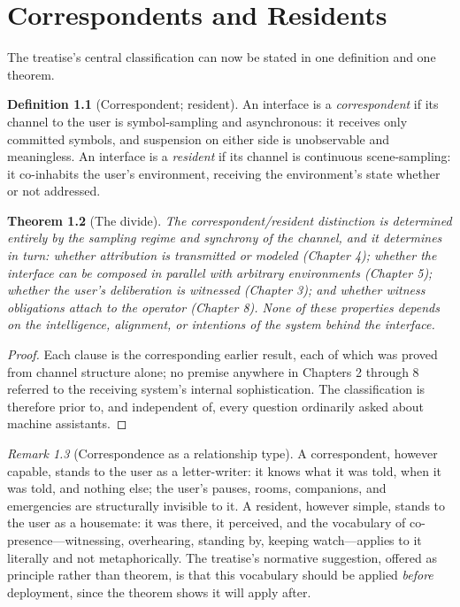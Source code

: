 \documentclass[11pt,oneside]{book}
\theoremstyle{plain}
\newtheorem{theorem}{Theorem}[chapter]
\theoremstyle{definition}
\newtheorem{definition}[theorem]{Definition}
\theoremstyle{remark}
\newtheorem{remark}[theorem]{Remark}
\begin{document}
\chapter{Correspondents and Residents}

The treatise's central classification can now be stated in one definition and one theorem.

\begin{definition}[Correspondent; resident]
An interface is a \emph{correspondent} if its channel to the user is symbol-sampling and asynchronous: it receives only committed symbols, and suspension on either side is unobservable and meaningless. An interface is a \emph{resident} if its channel is continuous scene-sampling: it co-inhabits the user's environment, receiving the environment's state whether or not addressed.
\end{definition}

\begin{theorem}[The divide]
The correspondent/resident distinction is determined entirely by the sampling regime and synchrony of the channel, and it determines in turn: whether attribution is transmitted or modeled (Chapter 4); whether the interface can be composed in parallel with arbitrary environments (Chapter 5); whether the user's deliberation is witnessed (Chapter 3); and whether witness obligations attach to the operator (Chapter 8). None of these properties depends on the intelligence, alignment, or intentions of the system behind the interface.
\end{theorem}

\begin{proof}
Each clause is the corresponding earlier result, each of which was proved from channel structure alone; no premise anywhere in Chapters 2 through 8 referred to the receiving system's internal sophistication. The classification is therefore prior to, and independent of, every question ordinarily asked about machine assistants.
\end{proof}

\begin{remark}[Correspondence as a relationship type]
A correspondent, however capable, stands to the user as a letter-writer: it knows what it was told, when it was told, and nothing else; the user's pauses, rooms, companions, and emergencies are structurally invisible to it. A resident, however simple, stands to the user as a housemate: it was there, it perceived, and the vocabulary of co-presence---witnessing, overhearing, standing by, keeping watch---applies to it literally and not metaphorically. The treatise's normative suggestion, offered as principle rather than theorem, is that this vocabulary should be applied \emph{before} deployment, since the theorem shows it will apply after.
\end{remark}
\end{document}
